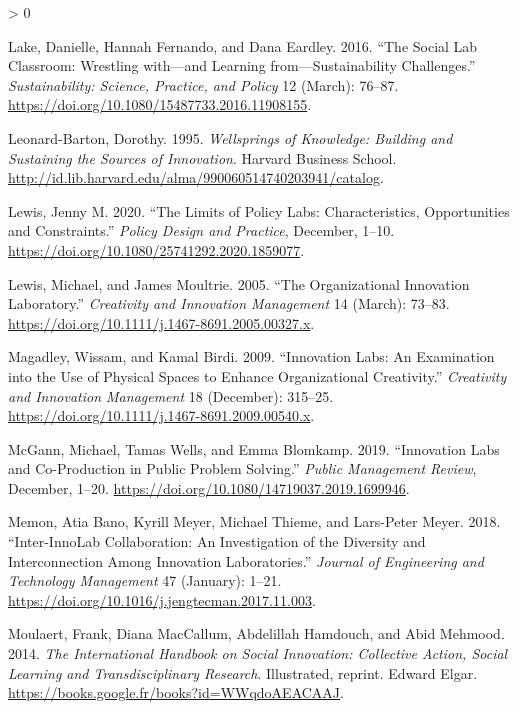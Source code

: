 \documentclass[AMA,STIX1COL,APA,STIX2COL]{WileyNJD-v2}
\newlength{\cslhangindent}
\newenvironment{CSLReferences}[2] %
 {%
  \setlength{\parindent}{0pt}
  \ifodd #1 \everypar{\setlength{\hangindent}{\cslhangindent}}\ignorespaces\fi
  \ifnum #2 > 0
  \setlength{\parskip}{#2\baselineskip}
  \fi
 }%
 {}
\begin{document}
\begin{CSLReferences}{1}{0}
\leavevmode\hypertarget{ref-Lake2016}{}%
Lake, Danielle, Hannah Fernando, and Dana Eardley. 2016. {``The Social
Lab Classroom: Wrestling with---and Learning from---Sustainability
Challenges.''} \emph{Sustainability: Science, Practice, and Policy} 12
(March): 76--87. \url{https://doi.org/10.1080/15487733.2016.11908155}.

\leavevmode\hypertarget{ref-Leonard1995}{}%
Leonard-Barton, Dorothy. 1995. \emph{Wellsprings of Knowledge: Building
and Sustaining the Sources of Innovation}. Harvard Business School.
\url{http://id.lib.harvard.edu/alma/990060514740203941/catalog}.

\leavevmode\hypertarget{ref-Lewis2020}{}%
Lewis, Jenny M. 2020. {``The Limits of Policy Labs: Characteristics,
Opportunities and Constraints.''} \emph{Policy Design and Practice},
December, 1--10. \url{https://doi.org/10.1080/25741292.2020.1859077}.

\leavevmode\hypertarget{ref-Lewis2005}{}%
Lewis, Michael, and James Moultrie. 2005. {``The Organizational
Innovation Laboratory.''} \emph{Creativity and Innovation Management} 14
(March): 73--83. \url{https://doi.org/10.1111/j.1467-8691.2005.00327.x}.

\leavevmode\hypertarget{ref-Magadley2009}{}%
Magadley, Wissam, and Kamal Birdi. 2009. {``Innovation Labs: An
Examination into the Use of Physical Spaces to Enhance Organizational
Creativity.''} \emph{Creativity and Innovation Management} 18
(December): 315--25.
\url{https://doi.org/10.1111/j.1467-8691.2009.00540.x}.

\leavevmode\hypertarget{ref-McGann2019}{}%
McGann, Michael, Tamas Wells, and Emma Blomkamp. 2019. {``Innovation
Labs and Co-Production in Public Problem Solving.''} \emph{Public
Management Review}, December, 1--20.
\url{https://doi.org/10.1080/14719037.2019.1699946}.

\leavevmode\hypertarget{ref-Memon2018}{}%
Memon, Atia Bano, Kyrill Meyer, Michael Thieme, and Lars-Peter Meyer.
2018. {``Inter-InnoLab Collaboration: An Investigation of the Diversity
and Interconnection Among Innovation Laboratories.''} \emph{Journal of
Engineering and Technology Management} 47 (January): 1--21.
\url{https://doi.org/10.1016/j.jengtecman.2017.11.003}.

\leavevmode\hypertarget{ref-Moulaert2014}{}%
Moulaert, Frank, Diana MacCallum, Abdelillah Hamdouch, and Abid Mehmood.
2014. \emph{The International Handbook on Social Innovation: Collective
Action, Social Learning and Transdisciplinary Research}. Illustrated,
reprint. Edward Elgar.
\url{https://books.google.fr/books?id=WWqdoAEACAAJ}.


\end{CSLReferences}
\end{document}
